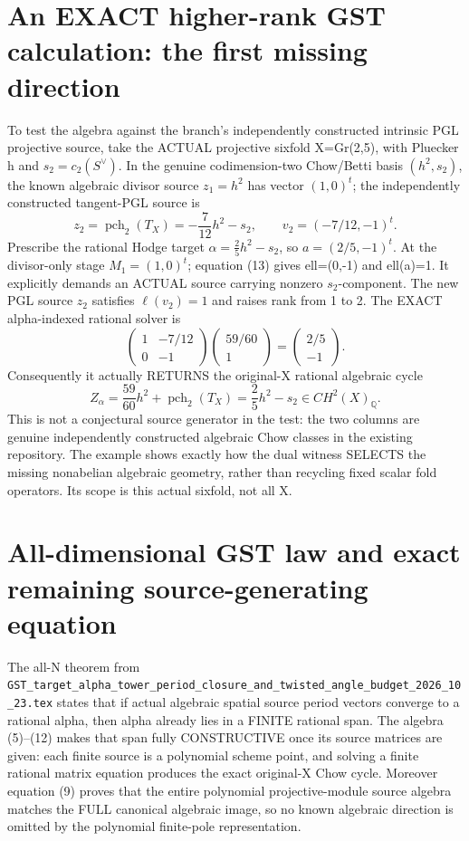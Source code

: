 \documentclass[11pt]{article}
\begin{document}
\section{An EXACT higher-rank GST calculation: the first missing direction}
To test the algebra against the branch's independently
constructed intrinsic PGL projective source, take the
ACTUAL projective sixfold X=Gr(2,5),
with Pluecker h and \(s_2=c_2(S^\vee)\).
In the genuine codimension-two Chow/Betti basis
\((h^2,s_2)\), the known algebraic
divisor source \(z_1=h^2\) has vector \((1,0)^t\);
the independently constructed tangent-PGL
source is
\[
 z_2=\operatorname{pch}_2(T_X)
               =-\frac7{12}h^2-s_2,
 \qquad v_2=(-7/12,-1)^t.                     \tag{16}
\]
Prescribe the rational Hodge target
\(\alpha=\frac25h^2-s_2\),
so \(a=(2/5,-1)^t\).
At the divisor-only stage \(M_1=(1,0)^t\);
equation (13) gives ell=(0,-1) and
ell(a)=1. It explicitly demands an ACTUAL
source carrying nonzero \(s_2\)-component.
The new PGL source \(z_2\) satisfies
\(\ell(v_2)=1\) and raises rank from 1 to 2.
The EXACT alpha-indexed rational solver is
\[
 \boxed{
 \begin{pmatrix}1&-7/12\\0&-1\end{pmatrix}
 \begin{pmatrix}59/60\\1\end{pmatrix}
 =\begin{pmatrix}2/5\\-1\end{pmatrix}.
 }                                                     \tag{17}
\]
Consequently it actually RETURNS the original-X
rational algebraic cycle
\[
 \boxed{Z_\alpha=\frac{59}{60}h^2+
     \operatorname{pch}_2(T_X)
       =\frac25h^2-s_2
       \in CH^2(X)_{\mathbb Q}.}                \tag{18}
\]
This is not a conjectural source generator in the
test: the two columns are genuine independently
constructed algebraic Chow classes in the
existing repository. The example shows exactly
how the dual witness SELECTS the missing
nonabelian algebraic geometry, rather than
recycling fixed scalar fold operators.
Its scope is this actual sixfold, not all X.

\section{All-dimensional GST law and exact remaining source-generating equation}
The all-N theorem from
\texttt{GST\_target\_alpha\_tower\_period\_closure\_and\_twisted\_angle\_budget\_2026\_10\_23.tex}
states that if actual algebraic spatial source
period vectors converge to a rational alpha, then
alpha already lies in a FINITE rational span.
The algebra (5)--(12) makes that span fully
CONSTRUCTIVE once its source matrices are given:
each finite source is a polynomial scheme point,
and solving a finite rational matrix equation
produces the exact original-X Chow cycle.
Moreover equation (9) proves that the entire
polynomial projective-module source algebra
matches the FULL canonical algebraic image,
so no known algebraic direction is omitted
by the polynomial finite-pole representation.
\end{document}
